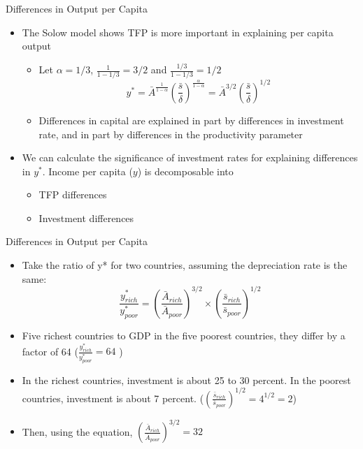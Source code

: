 \documentclass[aspectratio=1610]{beamer}
\begin{document}
\begin{frame}[wide]{Differences in Output per Capita}
	\begin{itemize}
			\item The Solow model shows TFP is more important in explaining per capita output
			\begin{itemize}
					\item Let $\alpha = 1/3$, $\frac{1}{1-1/3} = 3/2$ and $\frac{1/3}{1-1/3} = 1/2$
					\[y^* = \bar{A}^{\frac{1}{1-\alpha}} \left(\frac{\bar{s}}{\delta}\right)^{\frac{\alpha}{1-\alpha}}  = \bar{A}^{3/2}\left(\frac{\bar{s}}{\delta}\right)^{1/2}\]
					\item Differences in capital are explained in part by differences in investment rate, and in part by differences in the productivity parameter
				\end{itemize}
			\item We can calculate the significance of investment rates for explaining differences in $y^*$.	Income per capita ($y$) is decomposable into
			\begin{itemize}
					\item TFP differences
					\item Investment differences
				\end{itemize}
		\end{itemize}
\end{frame}

\begin{frame}[wide]{Differences in Output per Capita}
	\begin{itemize}
		\item Take the ratio of y* for two countries, assuming the depreciation rate is the same:
		\[\frac{y^*_{rich}}{y^*_{poor}} = \left(\frac{\bar{A}_{rich}}{\bar{A}_{poor}}\right)^{3/2} \times \left(\frac{\bar{s}_{rich}}{\bar{s}_{poor}}  \right)^{1/2}\]
		\item Five richest countries to GDP in the five poorest countries, they differ by a factor of 64 ($\frac{y^*_{rich}}{y^*_{poor}} = 64$ )
		\item In the richest countries, investment is about 25 to 30 percent. In the poorest countries, investment is about 7 percent. ($\left(\frac{\bar{s}_{rich}}{\bar{s}_{poor}}\right)^{1/2} = 4^{1/2} = 2$)
		\item Then, using the equation, $\left(\frac{\bar{A}_{rich}}{\bar{A}_{poor}}\right)^{3/2} = 32$
	\end{itemize}
\end{frame}
\end{document}
